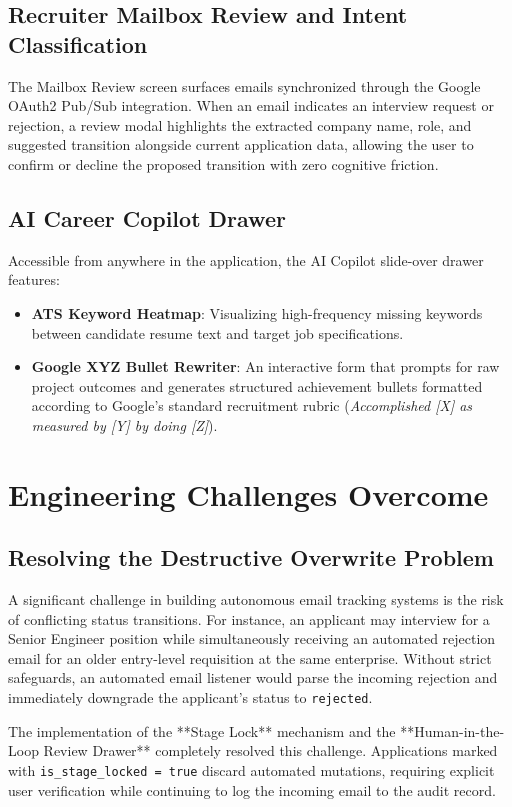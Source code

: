 \subsection{Recruiter Mailbox Review and Intent Classification}
The Mailbox Review screen surfaces emails synchronized through the Google OAuth2 Pub/Sub integration. When an email indicates an interview request or rejection, a review modal highlights the extracted company name, role, and suggested transition alongside current application data, allowing the user to confirm or decline the proposed transition with zero cognitive friction.

\subsection{AI Career Copilot Drawer}
Accessible from anywhere in the application, the AI Copilot slide-over drawer features:
\begin{itemize}
    \item \textbf{ATS Keyword Heatmap}: Visualizing high-frequency missing keywords between candidate resume text and target job specifications.
    \item \textbf{Google XYZ Bullet Rewriter}: An interactive form that prompts for raw project outcomes and generates structured achievement bullets formatted according to Google's standard recruitment rubric (\textit{Accomplished [X] as measured by [Y] by doing [Z]}).
\end{itemize}

\section{Engineering Challenges Overcome}

\subsection{Resolving the Destructive Overwrite Problem}
A significant challenge in building autonomous email tracking systems is the risk of conflicting status transitions. For instance, an applicant may interview for a Senior Engineer position while simultaneously receiving an automated rejection email for an older entry-level requisition at the same enterprise. Without strict safeguards, an automated email listener would parse the incoming rejection and immediately downgrade the applicant's status to \texttt{rejected}.

The implementation of the **Stage Lock** mechanism and the **Human-in-the-Loop Review Drawer** completely resolved this challenge. Applications marked with \texttt{is\_stage\_locked = true} discard automated mutations, requiring explicit user verification while continuing to log the incoming email to the audit record.

